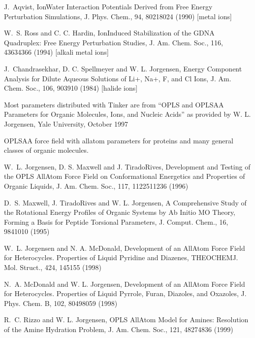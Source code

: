 \documentclass[letterpaper,11pt,english]{sphinxmanual}
\begin{document}
J. Aqvist, Ion\sphinxhyphen{}Water Interaction Potentials Derived from Free Energy Perturbation Simulations, J. Phys. Chem., 94, 8021\sphinxhyphen{}8024 (1990)  {[}metal ions{]}

W. S. Ross and C. C. Hardin, Ion\sphinxhyphen{}Induced Stabilization of the G\sphinxhyphen{}DNA Quadruplex: Free Energy Perturbation Studies, J. Am. Chem. Soc., 116, 4363\sphinxhyphen{}4366 (1994)  {[}alkali metal ions{]}

J. Chandrasekhar, D. C. Spellmeyer and W. L. Jorgensen, Energy Component Analysis for Dilute Aqueous Solutions of Li+, Na+, F\sphinxhyphen{}, and Cl\sphinxhyphen{} Ions, J. Am. Chem. Soc., 106, 903\sphinxhyphen{}910 (1984)  {[}halide ions{]}

Most parameters distributed with Tinker are from “OPLS and OPLS\sphinxhyphen{}AA Parameters for Organic Molecules, Ions, and Nucleic Acids” as provided by W. L. Jorgensen, Yale University, October 1997


OPLS\sphinxhyphen{}AA force field with all\sphinxhyphen{}atom parameters for proteins and many general classes of organic molecules.

W. L. Jorgensen, D. S. Maxwell and J. Tirado\sphinxhyphen{}Rives, Development and Testing of the OPLS All\sphinxhyphen{}Atom Force Field on Conformational Energetics and Properties of Organic Liquids, J. Am. Chem. Soc., 117, 11225\sphinxhyphen{}11236 (1996)

D. S. Maxwell, J. Tirado\sphinxhyphen{}Rives and W. L. Jorgensen, A Comprehensive Study of the Rotational Energy Profiles of Organic Systems by Ab Initio MO Theory, Forming a Basis for Peptide Torsional Parameters, J. Comput. Chem., 16, 984\sphinxhyphen{}1010 (1995)

W. L. Jorgensen and N. A. McDonald, Development of an All\sphinxhyphen{}Atom Force Field for Heterocycles. Properties of Liquid Pyridine and Diazenes, THEOCHEM\sphinxhyphen{}J. Mol. Struct., 424, 145\sphinxhyphen{}155 (1998)

N. A. McDonald and W. L. Jorgensen, Development of an All\sphinxhyphen{}Atom Force Field for Heterocycles. Properties of Liquid Pyrrole, Furan, Diazoles, and Oxazoles, J. Phys. Chem. B, 102, 8049\sphinxhyphen{}8059 (1998)

R. C. Rizzo and W. L. Jorgensen, OPLS All\sphinxhyphen{}Atom Model for Amines: Resolution of the Amine Hydration Problem, J. Am. Chem. Soc., 121, 4827\sphinxhyphen{}4836 (1999)
\end{document}
